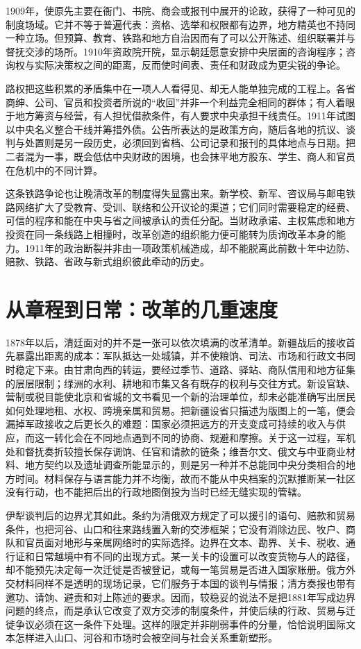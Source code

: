 1909年，使原先主要在衙门、书院、商会或报刊中展开的论政，获得了一种可见的制度场域。它并不等于普遍代表：资格、选举和权限都有边界，地方精英也不持同一种立场。但预算、教育、铁路和地方自治因而有了可以公开陈述、组织联署并与督抚交涉的场所。1910年资政院开院，显示朝廷愿意安排中央层面的咨询程序；咨询权与实际决策权之间的距离，反而使时间表、责任和财政成为更尖锐的争论。

路权把这些积累的矛盾集中在一项人人看得见、却无人能单独完成的工程上。各省商绅、公司、官员和投资者所说的“收回”并非一个利益完全相同的群体；有人着眼于地方筹资与经营，有人担忧借款条件，有人要求中央承担干线责任。1911年试图以中央名义整合干线并筹措外债。公告所表达的是政策方向，随后各地的抗议、谈判与处置则是另一段历史，必须回到省档、公司记录和报刊的具体地点与日期。把二者混为一事，既会低估中央财政的困境，也会抹平地方股东、学生、商人和官员在危机中的不同计算。

这条铁路争论也让晚清改革的制度得失显露出来。新学校、新军、咨议局与邮电铁路网络扩大了受教育、受训、联络和公开议论的渠道；它们同时需要稳定的经费、可信的程序和能在中央与省之间被承认的责任分配。当财政承诺、主权焦虑和地方投资在同一条线路上相撞时，改革创造的组织能力便可能转为质询改革本身的能力。1911年的政治断裂并非由一项政策机械造成，却不能脱离此前数十年中边防、赔款、铁路、省政与新式组织彼此牵动的历史。

\section{从章程到日常：改革的几重速度}

1878年以后，清廷面对的并不是一张可以依次填满的改革清单。新疆战后的接收首先暴露出距离的成本：军队抵达一处城镇，并不使粮饷、司法、市场和行政文书同时稳定下来。由甘肃向西的转运，要经过季节、道路、驿站、商队信用和地方征集的层层限制；绿洲的水利、耕地和市集又各有既存的权利与交往方式。新设官缺、营制或税目能使北京和省城的文书看见一个新的治理单位，却未必能准确写出居民如何处理地租、水权、跨境亲属和贸易。把新疆设省只描述为版图上的一笔，便会漏掉军政接收之后更长久的难题：国家必须把远方的开支变成可持续的收入与供应，而这一转化会在不同地点遇到不同的协商、规避和摩擦。关于这一过程，军机处和督抚奏折较擅长保存调饷、任官和请款的链条；维吾尔文、俄文与中亚商业材料、地方契约以及遗址调查所能显示的，则是另一种并不总能同中央分类相合的地方时间。材料保存与语言能力并不均衡，故而不能从中央档案的沉默推断某一社区没有行动，也不能把后出的行政地图倒投为当时已经无缝实现的管辖。

伊犁谈判后的边界尤其如此。条约为清俄双方规定了可以援引的语句、赔款和贸易条件，也把河谷、山口和往来路线置入新的交涉框架；它没有消除边民、牧户、商队和官员面对地形与亲属网络时的实际选择。边界在文本、勘界、关卡、税收、通行证和日常越境中有不同的出现方式。某一关卡的设置可以改变货物与人的路径，却不能预先决定每一次迁徙是否被登记，或每一笔贸易是否进入国家账册。俄方外交材料同样不是透明的现场记录，它们服务于本国的谈判与情报；清方奏报也带有邀功、请饷、避责和对上陈述的要求。因而，较稳妥的说法不是把1881年写成边界问题的终点，而是承认它改变了双方交涉的制度条件，并使后续的行政、贸易与迁徙争议必须在这一条件下处理。这样的限定并非削弱事件的分量，恰恰说明国际文本怎样进入山口、河谷和市场时会被空间与社会关系重新塑形。

